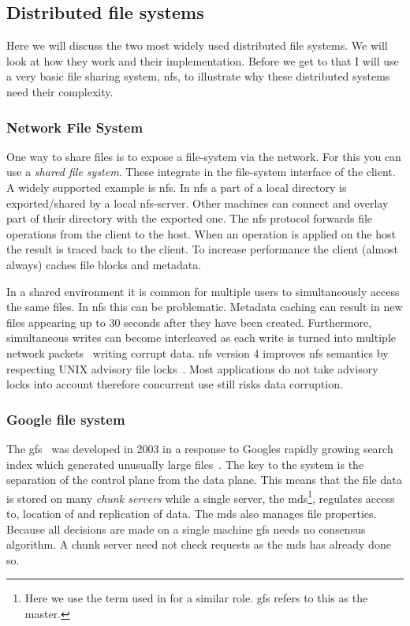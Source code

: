 \subsection{Distributed file systems}
Here we will discuss the two most widely used distributed file systems. We will look at how they work and their implementation. Before we get to that I will use a very basic file sharing system, \ac{nfs}, to illustrate why these distributed systems need their complexity.

\subsubsection*{Network File System}
One way to share files is to expose a file-system via the network. For this you can use a \textit{shared file system}. These integrate in the file-system interface of the client. A widely supported example is \acf{nfs}. In \ac{nfs} a part of a local directory is exported/shared by a local \ac{nfs}-server. Other machines can connect and overlay part of their directory with the exported one. The \ac{nfs} protocol forwards file operations from the client to the host. When an operation is applied on the host the result is traced back to the client. To increase performance the client (almost always) caches file blocks and metadata. 

In a shared environment it is common for multiple users to simultaneously access the same files. In \ac{nfs} this can be problematic. Metadata caching can result in new files appearing up to 30 seconds after they have been created. Furthermore, simultaneous writes can become interleaved as each write is turned into multiple network packets~\cite[p. 527]{os} writing corrupt data. \ac{nfs} version 4 improves \ac{nfs} semantics by respecting UNIX advisory file locks~\cite{rfc3530}. Most applications do not take advisory locks into account therefore concurrent use still risks data corruption. 

\subsubsection*{Google file system}
The \ac{gfs}~\cite{GFS} was developed in 2003 in a response to Googles rapidly growing search index which generated unusually large files~\cite{GFS_interview}. The key to the system is the separation of the control plane from the data plane. This means that the file data is stored on many \textit{chunk servers} while a single server, the \ac{mds}\footnote{Here we use the term used in \ceph{} for a similar role. \ac{gfs} refers to this as the master.}, regulates access to, location of and replication of data. The \ac{mds} also manages file properties. Because all decisions are made on a single machine \ac{gfs} needs no consensus algorithm. A chunk server need not check requests as the \ac{mds} has already done so. 

